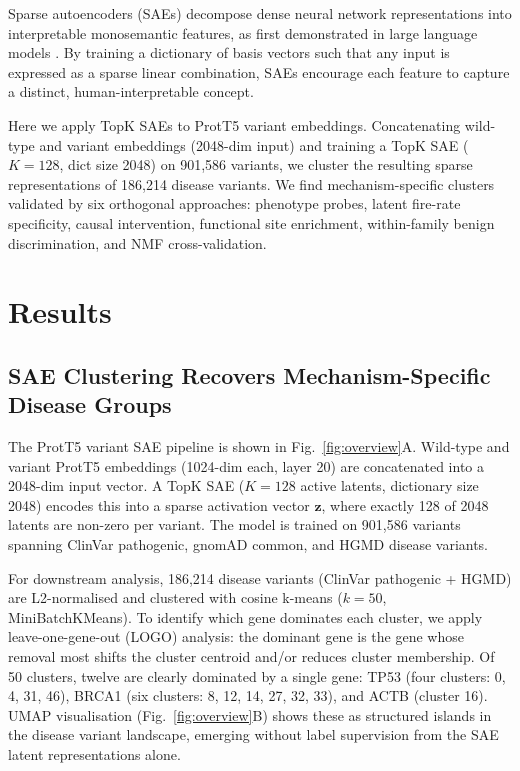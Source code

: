 \documentclass[10pt]{article}
\begin{document}
Sparse autoencoders (SAEs) decompose dense neural network representations into interpretable
monosemantic features, as first demonstrated in large language models
\citep{bricken2023towards,templeton2024scaling,gao2024scaling}. By training a dictionary of
basis vectors such that any input is expressed as a sparse linear combination, SAEs encourage
each feature to capture a distinct, human-interpretable concept.

Here we apply TopK SAEs to ProtT5 variant embeddings. Concatenating wild-type and variant
embeddings (2048-dim input) and training a TopK SAE ($K=128$, dict size 2048) on 901,586
variants, we cluster the resulting sparse representations of 186,214 disease variants. We
find mechanism-specific clusters validated by six orthogonal approaches: phenotype probes,
latent fire-rate specificity, causal intervention, functional site enrichment, within-family
benign discrimination, and NMF cross-validation.

\section{Results}

\subsection{SAE Clustering Recovers Mechanism-Specific Disease Groups}

The ProtT5 variant SAE pipeline is shown in Fig.~\ref{fig:overview}A. Wild-type and variant
ProtT5 embeddings (1024-dim each, layer 20) are concatenated into a 2048-dim input vector.
A TopK SAE ($K=128$ active latents, dictionary size 2048) encodes this into a sparse
activation vector $\mathbf{z}$, where exactly 128 of 2048 latents are non-zero per variant.
The model is trained on 901,586 variants spanning ClinVar pathogenic, gnomAD common, and
HGMD disease variants.

For downstream analysis, 186,214 disease variants (ClinVar pathogenic + HGMD) are L2-normalised
and clustered with cosine k-means ($k=50$, MiniBatchKMeans). To identify which gene dominates
each cluster, we apply leave-one-gene-out (LOGO) analysis: the dominant gene is the gene whose
removal most shifts the cluster centroid and/or reduces cluster membership. Of 50 clusters,
twelve are clearly dominated by a single gene: TP53 (four clusters: 0, 4, 31, 46), BRCA1
(six clusters: 8, 12, 14, 27, 32, 33), and ACTB (cluster 16). UMAP visualisation
(Fig.~\ref{fig:overview}B) shows these as structured islands in the disease variant landscape,
emerging without label supervision from the SAE latent representations alone.
\end{document}
